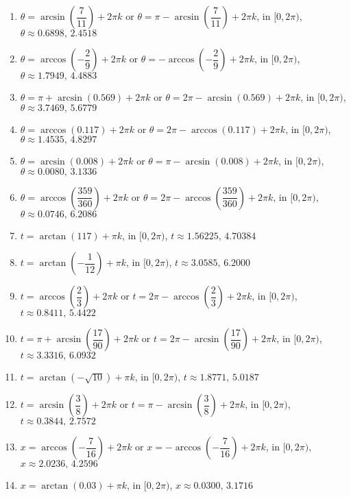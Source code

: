 \documentclass{ximera}
\begin{document}
\begin{enumerate}

\setcounter{enumi}{\value{HW}}

\item $\theta = \arcsin\left(\dfrac{7}{11}\right) + 2\pi k$ or $\theta = \pi - \arcsin\left(\dfrac{7}{11}\right) + 2\pi k$, in  $[0, 2\pi)$, $\theta \approx 0.6898, \, 2.4518$
\item $\theta = \arccos\left(-\dfrac{2}{9}\right) + 2\pi k$ or $\theta = - \arccos\left(-\dfrac{2}{9}\right) + 2\pi k$, in  $[0, 2\pi)$, $\theta \approx 1.7949, \, 4.4883$
\item $\theta = \pi + \arcsin(0.569) + 2\pi k$ or $\theta = 2\pi - \arcsin(0.569) + 2\pi k$, in  $[0, 2\pi)$, $\theta \approx 3.7469, \, 5.6779$
\item $\theta= \arccos(0.117) + 2\pi k$ or $\theta = 2\pi - \arccos(0.117) + 2\pi k$, in  $[0, 2\pi)$, $\theta \approx 1.4535, \, 4.8297$
\item $\theta = \arcsin(0.008) + 2\pi k$ or $\theta = \pi - \arcsin(0.008) + 2\pi k$, in  $[0, 2\pi)$, $\theta \approx 0.0080, \, 3.1336$
\item $\theta = \arccos\left(\dfrac{359}{360}\right) + 2\pi k$ or $\theta = 2\pi - \arccos\left(\dfrac{359}{360}\right) + 2\pi k$, in  $[0, 2\pi)$, $\theta \approx 0.0746, \, 6.2086$
\item $t = \arctan(117) + \pi k$, in  $[0, 2\pi)$, $t \approx 1.56225, \, 4.70384$
\item $t = \arctan\left(-\dfrac{1}{12}\right) + \pi k$, in  $[0, 2\pi)$,  $t \approx 3.0585, \, 6.2000$
\item $t = \arccos\left(\dfrac{2}{3}\right) + 2\pi k$ or $t = 2\pi - \arccos\left(\dfrac{2}{3}\right) + 2\pi k$, in  $[0, 2\pi)$, $t \approx 0.8411, \, 5.4422$
\item $t = \pi + \arcsin\left(\dfrac{17}{90}\right) + 2\pi k$ or $t = 2\pi - \arcsin\left(\dfrac{17}{90}\right) + 2\pi k$, in  $[0, 2\pi)$, $t \approx 3.3316, \, 6.0932$
\item $t = \arctan\left(-\sqrt{10}\right) + \pi k$, in  $[0, 2\pi)$, $t \approx 1.8771, \, 5.0187$
\item $t = \arcsin\left(\dfrac{3}{8}\right) + 2\pi k$ or $t = \pi - \arcsin\left(\dfrac{3}{8}\right) + 2\pi k$, in  $[0, 2\pi)$, $t \approx 0.3844, \, 2.7572$
\item $x =  \arccos\left(-\dfrac{7}{16}\right) + 2\pi k$ or $x = - \arccos\left(-\dfrac{7}{16}\right) + 2\pi k$, in  $[0, 2\pi)$, $x \approx 2.0236, \, 4.2596$
\item $x = \arctan(0.03) + \pi k$, in  $[0, 2\pi)$, $x \approx 0.0300, \, 3.1716$


\end{enumerate}
\end{document}
